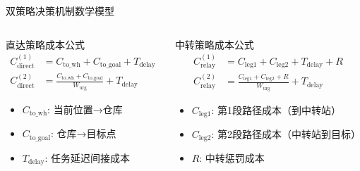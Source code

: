 \documentclass[
10pt,
aspectratio=169,
]{beamer}
\begin{document}
\begin{frame}{双策略决策机制数学模型}
    \begin{columns}[T]
        \begin{column}{0.48\textwidth}
            \begin{block}{直达策略成本公式}
                \vspace*{-2mm}
                \begin{align}
                    C_{\mathrm{direct}}^{(1)} &= C_{\mathrm{to\_wh}} + C_{\mathrm{to\_goal}} + T_{\mathrm{delay}} \\
                    C_{\mathrm{direct}}^{(2)} &= \frac{C_{\mathrm{to\_wh}} + C_{\mathrm{to\_goal}}}{W_{\mathrm{urg}}} + T_{\mathrm{delay}}
                \end{align}
                \vspace*{-4mm}
                \begin{itemize}
                    \item $C_{\mathrm{to\_wh}}$: 当前位置→仓库
                    \item $C_{\mathrm{to\_goal}}$: 仓库→目标点
                    \item $T_{\mathrm{delay}}$: 任务延迟间接成本
                \end{itemize}
            \end{block}
            
           
         
        \end{column}
        \hfill
        \begin{column}{0.48\textwidth}
            \begin{alertblock}{中转策略成本公式}
                \vspace*{-2mm}
                \begin{align}
                    C_{\mathrm{relay}}^{(1)} &= C_{\mathrm{leg1}} + C_{\mathrm{leg2}} + T_{\mathrm{delay}} + R \\
                    C_{\mathrm{relay}}^{(2)} &= \frac{C_{\mathrm{leg1}} + C_{\mathrm{leg2}} + R}{W_{\mathrm{urg}}} + T_{\mathrm{delay}}
                \end{align}
                \vspace*{-4mm}
                \begin{itemize}
                    \item $C_{\mathrm{leg1}}$: 第1段路径成本（到中转站）
                    \item $C_{\mathrm{leg2}}$: 第2段路径成本（中转站到目标）
                    \item $R$: 中转惩罚成本
                \end{itemize}
            \end{alertblock}
            

\end{column}
\end{columns}
\end{frame}
\end{document}
